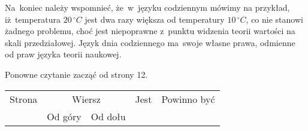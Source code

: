 \documentclass[a4paper,11pt]{article}
\begin{document}
Na~koniec należy wspomnieć, że~w~języku codziennym mówimy na przykład,
iż~temperatura $20 \, {}^{ \circ }\si{C}$ jest dwa razy większa od temperatury
$10 \, {}^{ \circ }\si{C}$, co nie stanowi żadnego problemu, choć jest
niepoprawne z~punktu widzenia teorii wartości na skali przedziałowej. Język
dnia codziennego ma~swoje własne prawa, odmienne od praw języka teorii
naukowej.

{\Large Ponowne czytanie zacząć od strony 12.}
























\newpage



\begin{center}

  \begin{tabular}{|c|c|c|c|c|}
    \hline
    Strona & \multicolumn{2}{c|}{Wiersz} & Jest
                              & Powinno być \\ \cline{2-3}
    & Od góry & Od dołu & & \\
    \hline
    \hline
  \end{tabular}

\end{center}

\vspace{\VerSpaceSix}

















{}






\end{document}
